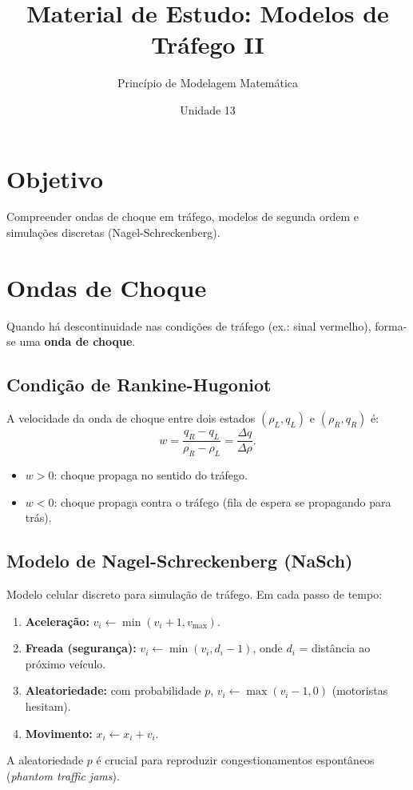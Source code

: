\documentclass[12pt,a4paper]{article}
\title{Material de Estudo: Modelos de Tr\'afego II}
\author{Princ\'ipio de Modelagem Matem\'atica}
\date{Unidade 13}
\begin{document}
\maketitle

\section*{Objetivo}
Compreender ondas de choque em tr\'afego, modelos de segunda ordem e simula\c{c}\~oes discretas (Nagel-Schreckenberg).

\section*{Ondas de Choque}

Quando h\'a descontinuidade nas condi\c{c}\~oes de tr\'afego (ex.: sinal vermelho), forma-se uma \textbf{onda de choque}.

\subsection*{Condi\c{c}\~ao de Rankine-Hugoniot}
A velocidade da onda de choque entre dois estados $(\rho_L, q_L)$ e $(\rho_R, q_R)$ \'e:
\[
w = \frac{q_R - q_L}{\rho_R - \rho_L} = \frac{\Delta q}{\Delta\rho}.
\]
\begin{itemize}
  \item $w > 0$: choque propaga no sentido do tr\'afego.
  \item $w < 0$: choque propaga contra o tr\'afego (fila de espera se propagando para tr\'as).
\end{itemize}

\subsection*{Modelo de Nagel-Schreckenberg (NaSch)}
Modelo celular discreto para simula\c{c}\~ao de tr\'afego. Em cada passo de tempo:
\begin{enumerate}
  \item \textbf{Acelera\c{c}\~ao:} $v_i \leftarrow \min(v_i+1, v_\text{max})$.
  \item \textbf{Freada (seguran\c{c}a):} $v_i \leftarrow \min(v_i, d_i-1)$, onde $d_i$ = dist\^ancia ao pr\'oximo ve\'iculo.
  \item \textbf{Aleatoriedade:} com probabilidade $p$, $v_i \leftarrow \max(v_i-1, 0)$ (motoristas hesitam).
  \item \textbf{Movimento:} $x_i \leftarrow x_i + v_i$.
\end{enumerate}
A aleatoriedade $p$ \'e crucial para reproduzir congestionamentos espont\^aneos (\textit{phantom traffic jams}).
\end{document}
